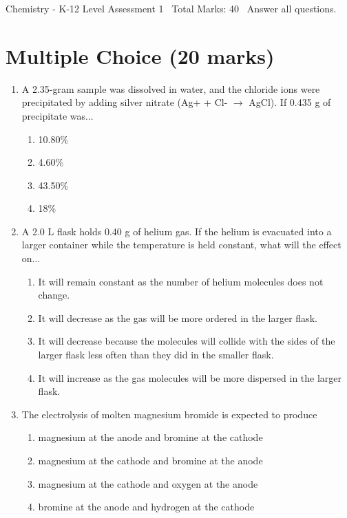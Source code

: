\documentclass[12pt]{article}
\begin{document}
\begin{center}
Chemistry - K-12 Level Assessment 1 \
Total Marks: 40 \
Answer all questions.
\end{center}

\section*{Multiple Choice (20 marks)}
\begin{enumerate}[label=\arabic*.]
\item A 2.35-gram sample was dissolved in water, and the chloride ions were precipitated by adding silver nitrate (Ag+ + Cl- $\rightarrow$ AgCl). If 0.435 g of precipitate was...
\begin{enumerate}[label=(\alph*)]
    \item 10.80\%
    \item 4.60\%
    \item 43.50\%
    \item 18\%
\end{enumerate}
\item A 2.0 L flask holds 0.40 g of helium gas. If the helium is evacuated into a larger container while the temperature is held constant, what will the effect on...
\begin{enumerate}[label=(\alph*)]
    \item It will remain constant as the number of helium molecules does not change.
    \item It will decrease as the gas will be more ordered in the larger flask.
    \item It will decrease because the molecules will collide with the sides of the larger flask less often than they did in the smaller flask.
    \item It will increase as the gas molecules will be more dispersed in the larger flask.
\end{enumerate}
\item The electrolysis of molten magnesium bromide is expected to produce
\begin{enumerate}[label=(\alph*)]
    \item magnesium at the anode and bromine at the cathode
    \item magnesium at the cathode and bromine at the anode
    \item magnesium at the cathode and oxygen at the anode
    \item bromine at the anode and hydrogen at the cathode
\end{enumerate}

\end{enumerate}
\end{document}
